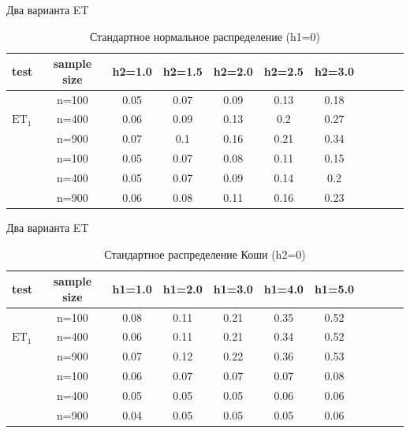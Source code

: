 \documentclass[12pt]{beamer}
\begin{document}
\begin{frame}{Два варианта ET}
	\begin{table}[!h]
		\centering
		\caption{Стандартное нормальное распределение (h1=0)}
		\hspace*{-0.6cm}\begin{tabular}{l c c c c c c c c c c} 
			\toprule
			test & sample size & h2=1.0 & h2=1.5 & h2=2.0 & h2=2.5 & h2=3.0\\ 
			\midrule
			\multirow{3}{*}{$\text{ET}_1$} 
			& n=100 & 0.05 & 0.07 & 0.09 & 0.13 & 0.18\\ 
			& n=400 & 0.06 & 0.09 & 0.13 & 0.2 & 0.27  \\ 
			& n=900 & 0.07 & 0.1 & 0.16 & 0.21 & 0.34 \\ 
			\addlinespace
			\addlinespace
			\multirow{3}{*}{$\text{ET}_2$} 
			& n=100 & 0.05 & 0.07 & 0.08 & 0.11 & 0.15 \\ 
			& n=400 & 0.05 & 0.07 & 0.09 & 0.14 & 0.2   \\ 
			& n=900 & 0.06 & 0.08 & 0.11 & 0.16 & 0.23 \\ 
			\bottomrule
		\end{tabular}
		\label{tbl:et_comp_normal_h2}
	\end{table}
\end{frame}
\begin{frame}{Два варианта ET}
	\begin{table}[!h]
		\centering
		\caption{Стандартное распределение Коши (h2=0)}
		\hspace*{-0.6cm}\begin{tabular}{l c c c c c c c c c c} 
			\toprule
			test & sample size & h1=1.0 & h1=2.0 & h1=3.0 & h1=4.0 & h1=5.0 \\ 
			\midrule
			\multirow{3}{*}{$\text{ET}_1$} 
			& n=100 & 0.08 & 0.11 & 0.21 & 0.35 & 0.52 \\ 
			& n=400 & 0.06 & 0.11 & 0.21 & 0.34 & 0.52 \\ 
			& n=900 & 0.07 & 0.12 & 0.22 & 0.36 & 0.53 \\ 
			\addlinespace
			\addlinespace
			\multirow{3}{*}{$\text{ET}_2$} 
			& n=100 & 0.06 & 0.07 & 0.07 & 0.07 & 0.08  \\ 
			& n=400 & 0.05 & 0.05 & 0.05 & 0.06 & 0.06 \\ 
			& n=900 & 0.04 & 0.05 & 0.05 & 0.05 & 0.06 \\ 
			\bottomrule
		\end{tabular}
		\label{tbl:et_comp_cauchy_h1}
	\end{table}
\end{frame}
\end{document}

